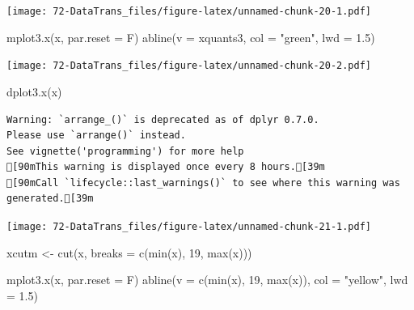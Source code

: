 \documentclass[
]{book}
\newenvironment{Shaded}{\begin{snugshade}}{\end{snugshade}}
\newcommand{\AttributeTok}[1]{\textcolor[rgb]{0.77,0.63,0.00}{#1}}
\newcommand{\DecValTok}[1]{\textcolor[rgb]{0.00,0.00,0.81}{#1}}
\newcommand{\FloatTok}[1]{\textcolor[rgb]{0.00,0.00,0.81}{#1}}
\newcommand{\FunctionTok}[1]{\textcolor[rgb]{0.00,0.00,0.00}{#1}}
\newcommand{\NormalTok}[1]{#1}
\newcommand{\OtherTok}[1]{\textcolor[rgb]{0.56,0.35,0.01}{#1}}
\newcommand{\StringTok}[1]{\textcolor[rgb]{0.31,0.60,0.02}{#1}}
\begin{document}
\texttt{[image: 72-DataTrans\_files/figure-latex/unnamed-chunk-20-1.pdf]}

\begin{Shaded}
\begin{Highlighting}[]
\FunctionTok{mplot3.x}\NormalTok{(x, }\AttributeTok{par.reset =}\NormalTok{ F)}
\FunctionTok{abline}\NormalTok{(}\AttributeTok{v =}\NormalTok{ xquants3, }\AttributeTok{col =} \StringTok{"green"}\NormalTok{, }\AttributeTok{lwd =} \FloatTok{1.5}\NormalTok{)}
\end{Highlighting}
\end{Shaded}

\texttt{[image: 72-DataTrans\_files/figure-latex/unnamed-chunk-20-2.pdf]}

\begin{Shaded}
\begin{Highlighting}[]
\FunctionTok{dplot3.x}\NormalTok{(x)}
\end{Highlighting}
\end{Shaded}

\begin{verbatim}
Warning: `arrange_()` is deprecated as of dplyr 0.7.0.
Please use `arrange()` instead.
See vignette('programming') for more help
[90mThis warning is displayed once every 8 hours.[39m
[90mCall `lifecycle::last_warnings()` to see where this warning was generated.[39m
\end{verbatim}

\texttt{[image: 72-DataTrans\_files/figure-latex/unnamed-chunk-21-1.pdf]}

\begin{Shaded}
\begin{Highlighting}[]
\NormalTok{xcutm }\OtherTok{\textless{}{-}} \FunctionTok{cut}\NormalTok{(x, }\AttributeTok{breaks =} \FunctionTok{c}\NormalTok{(}\FunctionTok{min}\NormalTok{(x), }\DecValTok{19}\NormalTok{, }\FunctionTok{max}\NormalTok{(x)))}
\end{Highlighting}
\end{Shaded}

\begin{Shaded}
\begin{Highlighting}[]
\FunctionTok{mplot3.x}\NormalTok{(x, }\AttributeTok{par.reset =}\NormalTok{ F)}
\FunctionTok{abline}\NormalTok{(}\AttributeTok{v =} \FunctionTok{c}\NormalTok{(}\FunctionTok{min}\NormalTok{(x), }\DecValTok{19}\NormalTok{, }\FunctionTok{max}\NormalTok{(x)), }\AttributeTok{col =} \StringTok{"yellow"}\NormalTok{, }\AttributeTok{lwd =} \FloatTok{1.5}\NormalTok{)}
\end{Highlighting}
\end{Shaded}
\end{document}
